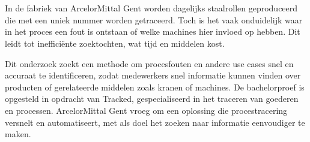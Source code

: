 
%
%
%
%
%

%



\chapter*{}
In de fabriek van ArcelorMittal Gent worden dagelijks staalrollen geproduceerd die met een uniek nummer worden getraceerd. 
Toch is het vaak onduidelijk waar in het proces een fout is ontstaan of welke machines hier invloed op hebben. 
Dit leidt tot inefficiënte zoektochten, wat tijd en middelen kost.

Dit onderzoek zoekt een methode om procesfouten en andere use cases snel en accuraat te identificeren, zodat medewerkers snel informatie kunnen vinden over producten of gerelateerde middelen zoals kranen of machines. 
De bachelorproef is opgesteld in opdracht van Tracked, gespecialiseerd in het traceren van goederen en processen. 
ArcelorMittal Gent vroeg om een oplossing die procestracering versnelt en automatiseert, met als doel het zoeken naar informatie eenvoudiger te maken.

